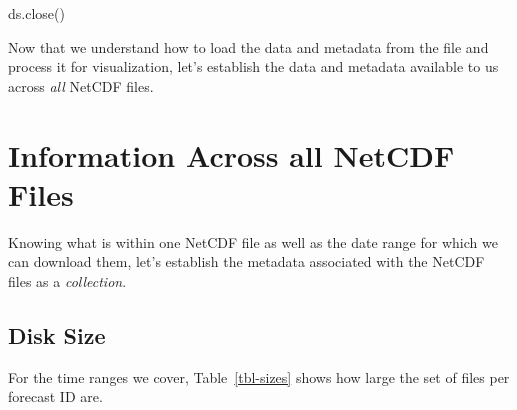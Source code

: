 \documentclass[
  letterpaper,
  DIV=11,
  numbers=noendperiod]{scrreprt}
\newenvironment{Shaded}{\begin{snugshade}}{\end{snugshade}}
\newcommand{\NormalTok}[1]{\textcolor[rgb]{0.00,0.23,0.31}{#1}}
\begin{document}
\begin{Shaded}
\begin{Highlighting}[]
\NormalTok{ds.close()}
\end{Highlighting}
\end{Shaded}

Now that we understand how to load the data and metadata from the file
and process it for visualization, let's establish the data and metadata
available to us across \emph{all} NetCDF files.

\section{Information Across all NetCDF Files}\label{sec-collection-info}

Knowing what is within one NetCDF file as well as the date range for
which we can download them, let's establish the metadata associated with
the NetCDF files as a \emph{collection}.

\subsection{Disk Size}\label{disk-size}

For the time ranges we cover, Table~\ref{tbl-sizes} shows how large the
set of files per forecast ID are.
\end{document}

